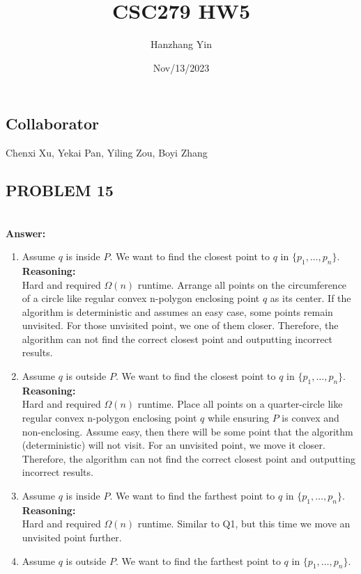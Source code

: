 \documentclass{article}
\title{CSC279 HW5}
\author{Hanzhang Yin}
\date{Nov/13/2023}
\begin{document}
\maketitle

\subsection*{Collaborator}
Chenxi Xu, Yekai Pan, Yiling Zou, Boyi Zhang

\subsection*{PROBLEM 15}
\\
\textbf{Answer: }

\begin{enumerate}
    \item Assume $q$ is inside $P$. We want to find the closest point to $q$ in $\{p_1, \dots, p_n\}$.
    \\
    \textbf{Reasoning: }
    \\
    Hard and required $\Omega(n)$ runtime. Arrange all points on the circumference of a circle like regular convex n-polygon enclosing point $q$ as its center. 
    If the algorithm is deterministic and assumes an easy case, some points remain unvisited. For those unvisited point, we one of them closer.
    Therefore, the algorithm can not find the correct closest point and outputting incorrect results.
    \item Assume $q$ is outside $P$. We want to find the closest point to $q$ in $\{p_1, \dots, p_n\}$.
    \\
    \textbf{Reasoning: }
    \\
    Hard and required $\Omega(n)$ runtime. Place all points on a quarter-circle like regular convex n-polygon enclosing point $q$ while ensuring $P$ is convex and non-enclosing.
    Assume easy, then there will be some point that the algorithm (deterministic) will not visit. For an unvisited point, we move it closer. 
    Therefore, the algorithm can not find the correct closest point and outputting incorrect results.
    \item Assume $q$ is inside $P$. We want to find the farthest point to $q$ in $\{p_1, \dots, p_n\}$.
    \\
    \textbf{Reasoning: }
    \\
    Hard and required $\Omega(n)$ runtime. Similar to Q1, but this time we move an unvisited point further.
    \item Assume $q$ is outside $P$. We want to find the farthest point to $q$ in $\{p_1, \dots, p_n\}$.

\end{enumerate}
\end{document}
